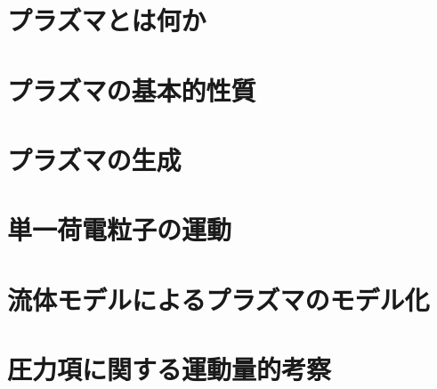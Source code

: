\documentclass{report}
\begin{document}
  \maketitle
  \tableofcontents
  \setcounter{chapter}{-1}
  \chapter{プラズマとは何か}
    
  \chapter{プラズマの基本的性質}
    
  \chapter{プラズマの生成}
    
  \chapter{単一荷電粒子の運動}
    
  \chapter{流体モデルによるプラズマのモデル化}
    
  \appendix
    \chapter{圧力項に関する運動量的考察}
      
  \printindex
\end{document}
